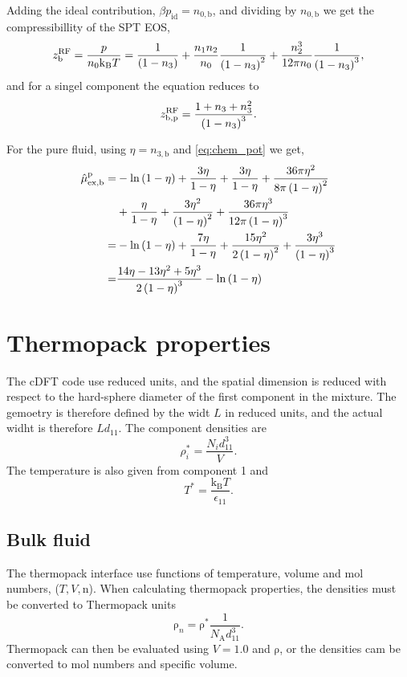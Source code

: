 \documentclass[12pt, letterpaper]{article}
\newcommand*{\lb}{\ensuremath{\left(}}
\newcommand*{\rb}{\ensuremath{\right)}}
\newcommand{\RF}{\ensuremath{\text{RF}}\xspace}
\newcommand{\excess}{\ensuremath{\text{ex}}\xspace}
\newcommand{\ideal}{\ensuremath{\text{id}}\xspace}
\newcommand{\kB}{\ensuremath{\text{k}_{\text{B}}}\xspace}
\newcommand{\NA}{\ensuremath{N_{\text{A}}}\xspace}
\newcommand{\bulk}{\ensuremath{\text{b}}\xspace}
\newcommand{\pure}{\ensuremath{\text{p}}\xspace}
\begin{document}
Adding the ideal contribution, $\beta p_{\ideal} = n_{0,\bulk}$, and
dividing by $n_{0,\bulk}$ we get the compressibillity of the SPT EOS,
\begin{equation}
  z^\RF_\bulk = \frac{p}{n_0 \kB T} = \frac{1}{\lb 1 - n_3 \rb} + \frac{n_1 n_2}{n_0} \frac{1}{\lb 1 - n_3 \rb^2} + \frac{n_2^3}{12 \pi n_0} \frac{1}{\lb 1 - n_3 \rb^3},
\end{equation}
and for a singel component the equation reduces to
\begin{equation}
  z^\RF_{\bulk,\pure} = \frac{1 + n_3 + n_3^2}{\lb 1 - n_3 \rb^3}.
\end{equation}

For the pure fluid, using $\eta = n_{3,\bulk}$ and \eqref{eq:chem_pot} we get,
\begin{align}
  \hat{\mu}^\pure_{\excess,\bulk} =& -\ln \lb 1 - \eta \rb + \frac{3 \eta}{1 - \eta} + \frac{3 \eta}{1 - \eta} + \frac{36\pi\eta^2}{8\pi \lb 1 - \eta \rb^2}\nonumber \\
  & +\frac{\eta}{1 - \eta} +
  \frac{3 \eta^2}{\lb 1 - \eta \rb^2} +
    \frac{36\pi\eta^3}{12\pi \lb 1 - \eta \rb^3}\nonumber \\
   =&-\ln \lb 1 - \eta \rb + \frac{7 \eta}{1 - \eta} + \frac{15\eta^2}{2\lb 1 - \eta \rb^2}+
      \frac{3\eta^3}{\lb 1 - \eta \rb^3}\nonumber \\
  =&\frac{14\eta - 13\eta^2 + 5\eta^3}{2\lb 1 - \eta \rb^3}-\ln \lb 1 - \eta \rb
\end{align}

\section{Thermopack properties}
The cDFT code use reduced units, and the spatial dimension is reduced
with respect to the hard-sphere diameter of the first component in the
mixture. The gemoetry is therefore defined by the widt $L$ in reduced
units, and the actual widht is therefore $L d_{11}$. The component densities are
\begin{equation}
  \rho_{i}^* = \frac{N_id_{11}^3}{V}.
\end{equation}
The temperature is also given from component 1 and
\begin{equation}
  T^* = \frac{\kB T}{\epsilon_{11}}.
\end{equation}

\subsection{Bulk fluid}
The thermopack interface use functions of temperature, volume and mol
numbers, ($T, V, \mathrm{n}$). When calculating thermopack properties,
the densities must be converted to Thermopack units
\begin{equation}
  \mathrm{\rho}_n = \mathrm{\rho}^*\frac{1}{\NA d_{11}^3}.
\end{equation}
Thermopack can then be evaluated using $V=1.0$ and $\mathrm{\rho}$, or
the densities cam be converted to mol numbers and specific volume.
\end{document}
